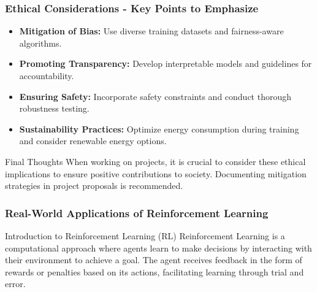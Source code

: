\documentclass[aspectratio=169]{beamer}
\begin{document}
\begin{frame}[fragile]
    \frametitle{Ethical Considerations - Key Points to Emphasize}
    \begin{itemize}
        \item \textbf{Mitigation of Bias:} Use diverse training datasets and fairness-aware algorithms.
        \item \textbf{Promoting Transparency:} Develop interpretable models and guidelines for accountability.
        \item \textbf{Ensuring Safety:} Incorporate safety constraints and conduct thorough robustness testing.
        \item \textbf{Sustainability Practices:} Optimize energy consumption during training and consider renewable energy options.
    \end{itemize}

    \begin{block}{Final Thoughts}
        When working on projects, it is crucial to consider these ethical implications to ensure positive contributions to society. Documenting mitigation strategies in project proposals is recommended.
    \end{block}
\end{frame}

\begin{frame}[fragile]
    \frametitle{Real-World Applications of Reinforcement Learning}
    
    \begin{block}{Introduction to Reinforcement Learning (RL)}
        Reinforcement Learning is a computational approach where agents learn to make decisions by interacting with their environment to achieve a goal.
        The agent receives feedback in the form of rewards or penalties based on its actions, facilitating learning through trial and error.
    \end{block}
\end{frame}
\end{document}
